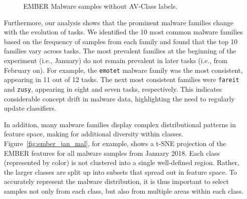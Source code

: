 


\begin{figure}[t]
\begin{minipage}[c]{\linewidth}
\centering

\vskip -0.25cm
\caption{EMBER Malware samples without AV-Class labels.}
\label{fig:ember_noavclass}
\end{minipage}%
\vskip -0.4cm
\end{figure}



Furthermore, our analysis shows that the prominent malware families change with the evolution of tasks. We identified the 10 most common malware families based on the frequency of samples from each family and found that the top 10 families vary across tasks. The most prevalent families at the beginning of the experiment (i.e., January) do not remain prevalent in later tasks (i.e., from February on). For example, the \texttt{emotet} malware family was the most consistent, appearing in 11 out of 12 tasks. The next most consistent families were \texttt{fareit} and \texttt{zusy}, appearing in eight and seven tasks, respectively. This indicates considerable concept drift in malware data, highlighting the need to regularly update classifiers.

In addition, many malware families display complex distributional patterns in feature space, making for additional diversity within classes. Figure~\ref{fig:ember_jan_mal}, for example, shows a t-SNE projection of the EMBER features for all malware samples from January 2018. Each class (represented by color) is not clustered into a single well-defined region. Rather, the larger classes are split up into subsets that spread out in feature space. To accurately represent the malware distribution, it is thus important to select samples not only from each class, but also from multiple areas within each class.

